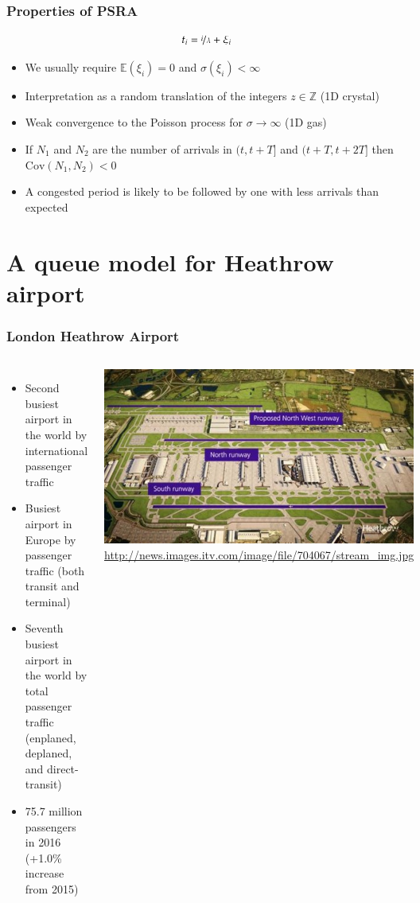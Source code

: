 \documentclass[table,aspectratio=169]{beamer}
\begin{document}
\begin{frame}[t]\frametitle{Properties of PSRA}
    \[t_i = \nicefrac{i}{\lambda} + \xi_i\]
    \begin{itemize}
        \item We usually require $\mathbb{E}(\xi_i) = 0$ and $\sigma(\xi_i) < \infty$
        \item Interpretation as a random translation of the integers $z\in\mathbb{Z}$ (1D crystal)
        \item Weak convergence to the Poisson process for $\sigma \to \infty$ (1D gas)
        \item If $N_1$ and $N_2$ are the number of arrivals in $(t,t+T]$ and $(t + T , t + 2T ]$ then
        $\text{Cov}(N_1,N_2)<0$
        \item A congested period is likely to be followed
        by one with less arrivals than expected
    \end{itemize}
\end{frame}

\section{A queue model for Heathrow airport}

\begin{frame}[t]\frametitle{London Heathrow Airport}
    \begin{columns}
        \begin{itemize}
            \item Second busiest airport in the world by international passenger traffic
            \item Busiest airport in Europe by passenger traffic (both transit and terminal)
            \item Seventh busiest airport in the world by total passenger traffic (enplaned, deplaned, and direct-transit)
            \item 75.7 million passengers in 2016 (+1.0\% increase from 2015)
        \end{itemize}
        \centering
        \includegraphics[width=.95\textwidth]{stream_img}
        {\small \url{http://news.images.itv.com/image/file/704067/stream_img.jpg}}
    \end{columns}
\end{frame}
\end{document}
